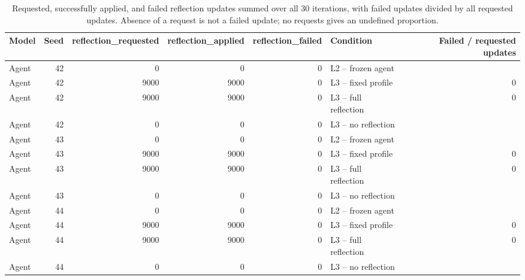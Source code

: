 \begin{table}[htbp!]
\centering
\small
\setlength{\tabcolsep}{3pt}
\renewcommand{\arraystretch}{1.1}
\begin{tabular}{lrrrrlr}
\hline
Model & Seed & reflection\_requested & reflection\_applied & reflection\_failed & Condition & Failed / requested updates \\
\hline
Agent & 42 & 0 & 0 & 0 & L2 -- frozen agent & \textemdash{} \\
Agent & 42 & 9000 & 9000 & 0 & L3 -- fixed profile & 0 \\
Agent & 42 & 9000 & 9000 & 0 & L3 -- full reflection & 0 \\
Agent & 42 & 0 & 0 & 0 & L3 -- no reflection & \textemdash{} \\
Agent & 43 & 0 & 0 & 0 & L2 -- frozen agent & \textemdash{} \\
Agent & 43 & 9000 & 9000 & 0 & L3 -- fixed profile & 0 \\
Agent & 43 & 9000 & 9000 & 0 & L3 -- full reflection & 0 \\
Agent & 43 & 0 & 0 & 0 & L3 -- no reflection & \textemdash{} \\
Agent & 44 & 0 & 0 & 0 & L2 -- frozen agent & \textemdash{} \\
Agent & 44 & 9000 & 9000 & 0 & L3 -- fixed profile & 0 \\
Agent & 44 & 9000 & 9000 & 0 & L3 -- full reflection & 0 \\
Agent & 44 & 0 & 0 & 0 & L3 -- no reflection & \textemdash{} \\
\hline
\end{tabular}
\caption{Requested, successfully applied, and failed reflection updates summed over all 30 iterations, with failed updates divided by all requested updates. Absence of a request is not a failed update; no requests gives an undefined proportion.}
\label{chap:results:tab:rq3_reflection_totals}
\end{table}
